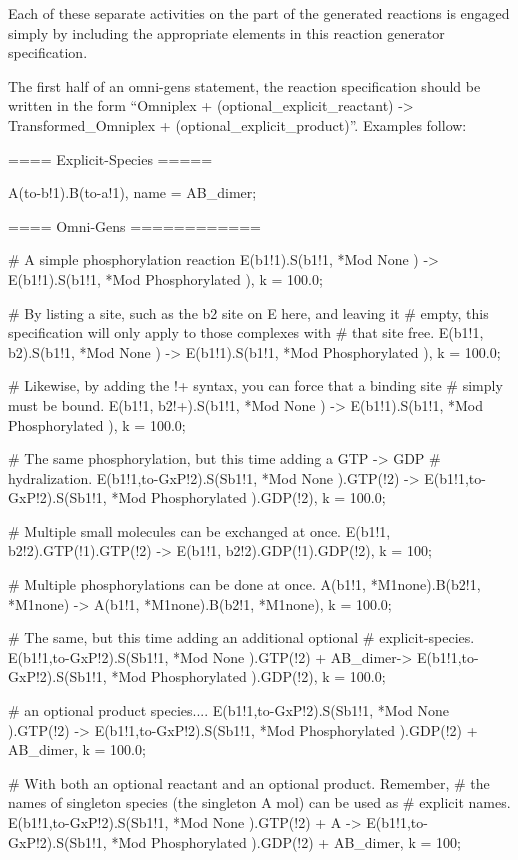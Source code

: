  Each of these separate activities on the part of the generated
 reactions is engaged simply by including the appropriate elements in
 this reaction generator specification.
 
 The first half of an omni-gens statement, the reaction specification
 should be written in the form ``Omniplex + (optional\_explicit\_reactant) ->
 Transformed\_Omniplex + (optional\_explicit\_product)''.  Examples follow:

\begin{ExampleMZR}

==== Explicit-Species =====

A(to-b!1).B(to-a!1), name = AB_dimer;


==== Omni-Gens ============

# A simple phosphorylation reaction
E(b1!1).S(b1!1, *Mod{ None }) -> E(b1!1).S(b1!1, *Mod{ Phosphorylated }),
     k = 100.0;

# By listing a site, such as the b2 site on E here, and leaving it
# empty, this specification will only apply to those complexes with
# that site free.
E(b1!1, b2).S(b1!1, *Mod{ None }) -> E(b1!1).S(b1!1, *Mod{ Phosphorylated }),
     k = 100.0;

# Likewise, by adding the !+ syntax, you can force that a binding site
# simply must be bound.
E(b1!1, b2!+).S(b1!1, *Mod{ None }) -> E(b1!1).S(b1!1, *Mod{ Phosphorylated }),
     k = 100.0;

# The same phosphorylation, but this time adding a GTP -> GDP
# hydralization.  
E(b1!1,to-GxP!2).S(Sb1!1, *Mod{ None }).GTP(!2) ->
  E(b1!1,to-GxP!2).S(Sb1!1, *Mod{ Phosphorylated }).GDP(!2),
    k = 100.0;

# Multiple small molecules can be exchanged at once.
E(b1!1, b2!2).GTP(!1).GTP(!2) -> E(b1!1, b2!2).GDP(!1).GDP(!2), k = 100;

# Multiple phosphorylations can be done at once.  
A(b1!1, *M1{none}).B(b2!1, *M1{none}) -> A(b1!1, *M1{none}).B(b2!1, *M1{none}),
   k = 100.0;

# The same, but this time adding an additional optional
# explicit-species. 
E(b1!1,to-GxP!2).S(Sb1!1, *Mod{ None }).GTP(!2) + AB\_dimer->
  E(b1!1,to-GxP!2).S(Sb1!1, *Mod{ Phosphorylated }).GDP(!2),
   k = 100.0;

# an optional product species....
E(b1!1,to-GxP!2).S(Sb1!1, *Mod{ None }).GTP(!2) ->
  E(b1!1,to-GxP!2).S(Sb1!1, *Mod{ Phosphorylated }).GDP(!2)  + AB\_dimer,
    k = 100.0;

# With both an optional reactant and an optional product.  Remember,
# the names of singleton species (the singleton A mol) can be used as
# explicit names.  
E(b1!1,to-GxP!2).S(Sb1!1, *Mod{ None }).GTP(!2) + A ->
  E(b1!1,to-GxP!2).S(Sb1!1, *Mod{ Phosphorylated }).GDP(!2)  + AB\_dimer,
    k = 100;
\end{ExampleMZR}

